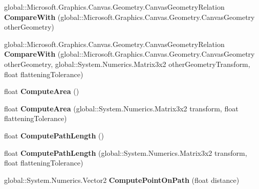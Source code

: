 \begin{DoxyCompactItemize}
global\+::\+Microsoft.\+Graphics.\+Canvas.\+Geometry.\+Canvas\+Geometry\+Relation {\bfseries Compare\+With} (global\+::\+Microsoft.\+Graphics.\+Canvas.\+Geometry.\+Canvas\+Geometry other\+Geometry)
\item 
\mbox{\label{class_microsoft_1_1_graphics_1_1_canvas_1_1_geometry_1_1_canvas_geometry_a46984a998579f41371f806face56cd8a}} 
global\+::\+Microsoft.\+Graphics.\+Canvas.\+Geometry.\+Canvas\+Geometry\+Relation {\bfseries Compare\+With} (global\+::\+Microsoft.\+Graphics.\+Canvas.\+Geometry.\+Canvas\+Geometry other\+Geometry, global\+::\+System.\+Numerics.\+Matrix3x2 other\+Geometry\+Transform, float flattening\+Tolerance)
\item 
\mbox{\label{class_microsoft_1_1_graphics_1_1_canvas_1_1_geometry_1_1_canvas_geometry_aa08eda160516a30cec6d6df2eff63201}} 
float {\bfseries Compute\+Area} ()
\item 
\mbox{\label{class_microsoft_1_1_graphics_1_1_canvas_1_1_geometry_1_1_canvas_geometry_a691883046354446e27838e64d21e99bb}} 
float {\bfseries Compute\+Area} (global\+::\+System.\+Numerics.\+Matrix3x2 transform, float flattening\+Tolerance)
\item 
\mbox{\label{class_microsoft_1_1_graphics_1_1_canvas_1_1_geometry_1_1_canvas_geometry_ac795f5b565a905b8bfbd67e69c327ceb}} 
float {\bfseries Compute\+Path\+Length} ()
\item 
\mbox{\label{class_microsoft_1_1_graphics_1_1_canvas_1_1_geometry_1_1_canvas_geometry_a5ddd0bb4b6fa3da6b55d5cdbfdbea574}} 
float {\bfseries Compute\+Path\+Length} (global\+::\+System.\+Numerics.\+Matrix3x2 transform, float flattening\+Tolerance)
\item 
\mbox{\label{class_microsoft_1_1_graphics_1_1_canvas_1_1_geometry_1_1_canvas_geometry_a5bc13e03dbf00e5ca5deef3ddcc406c8}} 
global\+::\+System.\+Numerics.\+Vector2 {\bfseries Compute\+Point\+On\+Path} (float distance)

\end{DoxyCompactItemize}
